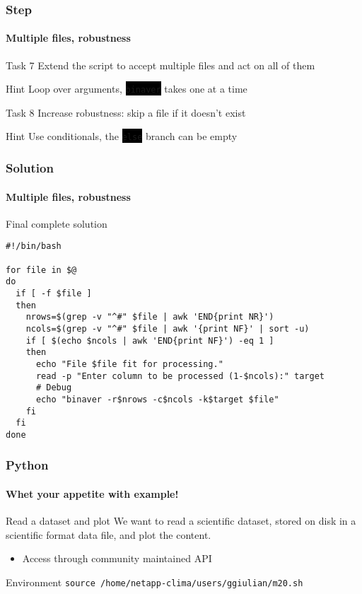 \documentclass[unknownkeysallowed, 10pt, a4 paper, handout]{beamer}
\newcommand{\code}[1]{\colorbox{black}{\color{green}\texttt{#1}}}
\begin{document}
\begin{frame}
  \frametitle{Step}
  \framesubtitle{Multiple files, robustness}

  \begin{exampleblock}{Task 7}
    Extend the script to accept multiple files and act on all of them
  \end{exampleblock}

  \begin{alertblock}{Hint}
    Loop over arguments, \code{binaver} takes one at a time
  \end{alertblock}

  \begin{exampleblock}{Task 8}
    Increase robustness: skip a file if it doesn't exist
  \end{exampleblock}

  \begin{alertblock}{Hint}
    Use conditionals, the \code{else} branch can be empty
  \end{alertblock}
\end{frame}


\begin{frame}[fragile=singleslide]
  \frametitle{Solution}
  \framesubtitle{Multiple files, robustness}

  \begin{exampleblock}{Final complete solution}
    \small{
    \begin{verbatim}
#!/bin/bash

for file in $@
do
  if [ -f $file ]
  then
    nrows=$(grep -v "^#" $file | awk 'END{print NR}')
    ncols=$(grep -v "^#" $file | awk '{print NF}' | sort -u)
    if [ $(echo $ncols | awk 'END{print NF}') -eq 1 ]
    then
      echo "File $file fit for processing."
      read -p "Enter column to be processed (1-$ncols):" target
      # Debug
      echo "binaver -r$nrows -c$ncols -k$target $file"
    fi
  fi
done
    \end{verbatim}
    }
  \end{exampleblock}
\end{frame}


\begin{frame}[fragile=singleslide]
  \frametitle{Python}
  \framesubtitle{Whet your appetite with example!}

  \begin{exampleblock}{Read a dataset and plot}
    We want to read a scientific dataset, stored on disk
    in a scientific format data file, and plot the content.
    \begin{itemize}
       \item Access through community maintained API
    \end{itemize}
  \end{exampleblock}

  \begin{alertblock}{Environment}
    \verb|source /home/netapp-clima/users/ggiulian/m20.sh|
  \end{alertblock}
\end{frame}
\end{document}

